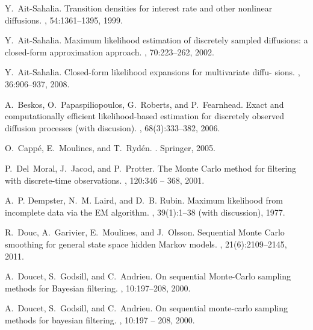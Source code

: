 \documentclass[12pt]{article}
\newcommand{\1}{\mathrm{1}}
\begin{document}

\begin{thebibliography}{10}

Y.~Ait-Sahalia.
\newblock Transition densities for interest rate and other nonlinear
  diffusions.
, 54:1361--1395, 1999.

Y.~Ait-Sahalia.
\newblock Maximum likelihood estimation of discretely sampled diffusions: a
  closed-form approximation approach.
, 70:223--262, 2002.

Y.~Ait-Sahalia.
\newblock Closed-form likelihood expansions for multivariate diffu- sions.
, 36:906--937, 2008.

A.~Beskos, O.~Papaspiliopoulos, G.~Roberts, and P.~Fearnhead.
\newblock Exact and computationally efficient likelihood-based estimation for
  discretely observed diffusion processes (with discusion).
, 68(3):333--382, 2006.

O.~Capp\'{e}, E.~Moulines, and T.~Ryd\'{e}n.
.
\newblock Springer, 2005.

P.~Del~Moral, J.~Jacod, and P.~Protter.
\newblock The {M}onte {C}arlo method for filtering with discrete-time
  observations.
, 120:346 -- 368,
  2001.

A.~P. Dempster, N.~M. Laird, and D.~B. Rubin.
\newblock Maximum likelihood from incomplete data via the {EM} algorithm.
, 39(1):1--38 (with discussion), 1977.

R.~Douc, A.~Garivier, E.~Moulines, and J.~Olsson.
\newblock Sequential {M}onte {C}arlo smoothing for general state space hidden
  {M}arkov models.
, 21(6):2109--2145, 2011.

A.~Doucet, S.~Godsill, and C.~Andrieu.
\newblock On sequential {M}onte-{C}arlo sampling methods for {B}ayesian
  filtering.
, 10:197--208, 2000.

A.~Doucet, S.~Godsill, and C.~Andrieu.
\newblock On sequential monte-carlo sampling methods for bayesian filtering.
, 10:197 -- 208, 2000.


\end{thebibliography}
\end{document}
